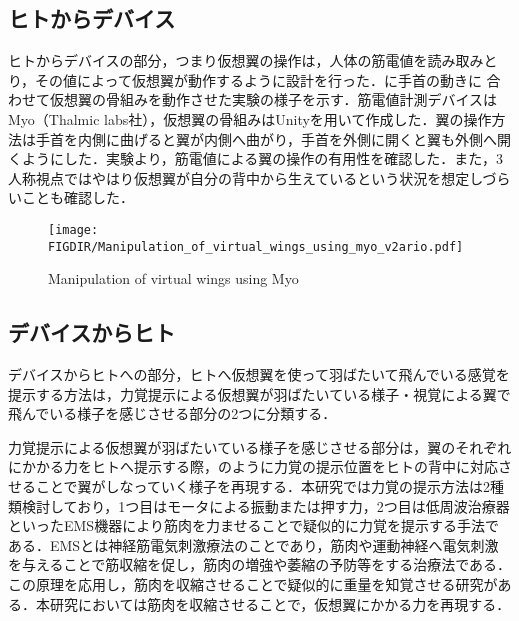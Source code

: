 \begin{small}
  \subsection{ヒトからデバイス}
    ヒトからデバイスの部分，つまり仮想翼の操作は，人体の筋電値を読み取みとり，その値によって仮想翼が動作するように設計を行った．に手首の動きに
    合わせて仮想翼の骨組みを動作させた実験の様子を示す．筋電値計測デバイスはMyo（Thalmic labs社），仮想翼の骨組みはUnityを用いて作成した．翼の操作方法は手首を内側に曲げると翼が内側へ曲がり，手首を外側に開くと翼も外側へ開くようにした．実験より，筋電値による翼の操作の有用性を確認した．また，3人称視点ではやはり仮想翼が自分の背中から生えているという状況を想定しづらいことも確認した．

    \begin{figure}[b]
      \begin{center}
        \vspace{3mm}
        \texttt{[image: \\FIGDIR/Manipulation\_of\_virtual\_wings\_using\_myo\_v2ario.pdf]}%
        \caption{Manipulation of virtual wings using Myo}
      \end{center}
    \end{figure}
    
    
  \subsection{デバイスからヒト}
    デバイスからヒトへの部分，ヒトへ仮想翼を使って羽ばたいて飛んでいる感覚を提示する方法は，力覚提示による仮想翼が羽ばたいている様子・視覚による翼で飛んでいる様子を感じさせる部分の2つに分類する．
    
    力覚提示による仮想翼が羽ばたいている様子を感じさせる部分は，翼のそれぞれにかかる力をヒトへ提示する際，のように力覚の提示位置をヒトの背中に対応させることで翼がしなっていく様子を再現する．本研究では力覚の提示方法は2種類検討しており，1つ目はモータによる振動または押す力，2つ目は低周波治療器といったEMS機器により筋肉を力ませることで疑似的に力覚を提示する手法である．EMSとは神経筋電気刺激療法のことであり，筋肉や運動神経へ電気刺激を与えることで筋収縮を促し，筋肉の増強や萎縮の予防等をする治療法である．この原理を応用し，筋肉を収縮させることで疑似的に重量を知覚させる研究がある\cite{小川剛史2017電気的筋肉刺激が重量知覚に及ぼす影響の分析}．本研究においては筋肉を収縮させることで，仮想翼にかかる力を再現する．


\end{small}
